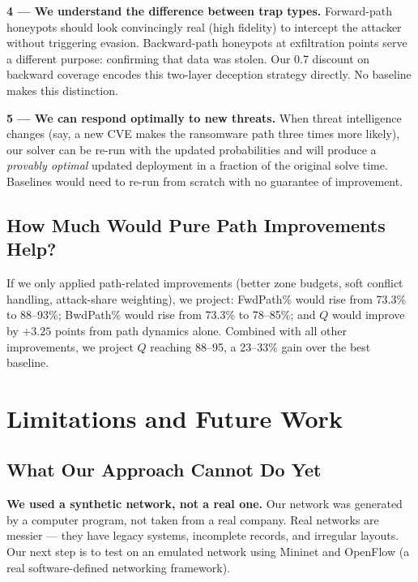 \documentclass[journal]{IEEEtran}
\begin{document}
\textbf{4 --- We understand the difference between trap types.}
Forward-path honeypots should look convincingly real (high
fidelity) to intercept the attacker without triggering evasion.
Backward-path honeypots at exfiltration points serve a different
purpose: confirming that data was stolen. Our 0.7 discount
on backward coverage encodes this two-layer deception strategy
directly. No baseline makes this distinction.

\textbf{5 --- We can respond optimally to new threats.}
When threat intelligence changes (say, a new CVE makes the
ransomware path three times more likely), our solver can be
re-run with the updated probabilities and will produce a
\emph{provably optimal} updated deployment in a fraction of
the original solve time. Baselines would need to re-run from
scratch with no guarantee of improvement.

\subsection{How Much Would Pure Path Improvements Help?}

If we only applied path-related improvements (better zone budgets,
soft conflict handling, attack-share weighting), we project:
FwdPath\% would rise from 73.3\% to 88--93\%;
BwdPath\% would rise from 73.3\% to 78--85\%;
and $Q$ would improve by $+3.25$ points from path dynamics alone.
Combined with all other improvements, we project $Q$ reaching
88--95, a 23--33\% gain over the best baseline.

\section{Limitations and Future Work}
\label{sec:discussion}

\subsection{What Our Approach Cannot Do Yet}

\textbf{We used a synthetic network, not a real one.}
Our network was generated by a computer program, not taken from
a real company. Real networks are messier --- they have legacy
systems, incomplete records, and irregular layouts. Our next
step is to test on an emulated network using Mininet and OpenFlow
(a real software-defined networking framework).
\end{document}
